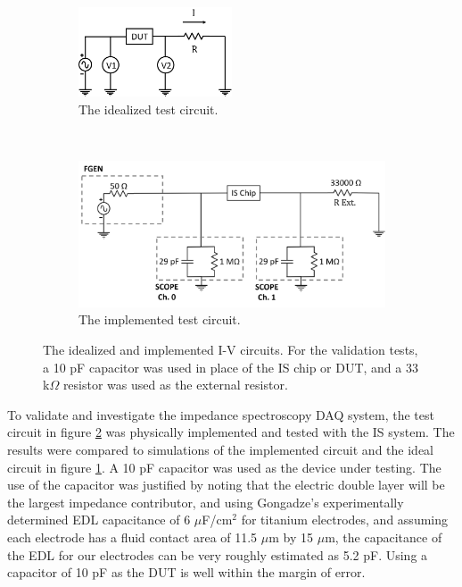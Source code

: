 \begin{figure}[h]
\centering
    \begin{subfigure}[b]{\textwidth}
        \centering
        \includegraphics[width=0.5\textwidth]{images/I-VMethod.png}
        \caption{The idealized test circuit.}
        \label{fig:IS_DAQ_test_circuit_ideal}
    \end{subfigure}
    \\
    \vspace{0.1 in}
    \begin{subfigure}[b]{0.85\textwidth}
        \centering
        \includegraphics[width=\textwidth]{images/method_I-V.png}
        \caption{The implemented test circuit.}
        \label{fig:IS_DAQ_test_circuit_implemented}
    \end{subfigure}
    \caption[Ideal and implemented I-V circuits.]{The idealized and implemented I-V circuits. For the validation tests, a 10 pF capacitor was used in place of the IS chip or DUT, and a 33 k$\Omega$ resistor was used as the external resistor.}
    \label{fig:IS_DAQ_test_circuit}
\end{figure}

\par To validate and investigate the impedance spectroscopy DAQ system, the test circuit in figure \ref{fig:IS_DAQ_test_circuit_implemented} was physically implemented and tested with the IS system. The results were compared to simulations of the implemented circuit and the ideal circuit in figure \ref{fig:IS_DAQ_test_circuit_ideal}. A 10 pF capacitor was used as the device under testing. The use of the capacitor was justified by noting that the electric double layer will be the largest impedance contributor, and using Gongadze's \cite{_gongadze.pdf_????} experimentally determined EDL capacitance of 6 $\mu$F/cm$^2$ for titanium electrodes, and assuming each electrode has a fluid contact area of 11.5 $\mu$m by 15 $\mu$m, the capacitance of the EDL for our electrodes can be very roughly estimated as 5.2 pF. Using a capacitor of 10 pF as the DUT is well within the margin of error.  

